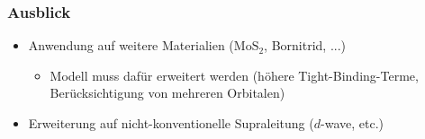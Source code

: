 \begin{frame}
    \frametitle{Ausblick}

    \begin{itemize}
        \item Anwendung auf weitere Materialien ($\mathrm{MoS_2}$, Bornitrid, ...)
        \begin{itemize}
            \item[$\rightarrow$] Modell muss dafür erweitert werden (höhere Tight-Binding-Terme, Berücksichtigung von mehreren Orbitalen)
        \end{itemize}
        \item Erweiterung auf nicht-konventionelle Supraleitung ($d$-wave, etc.)
    \end{itemize}

\end{frame}